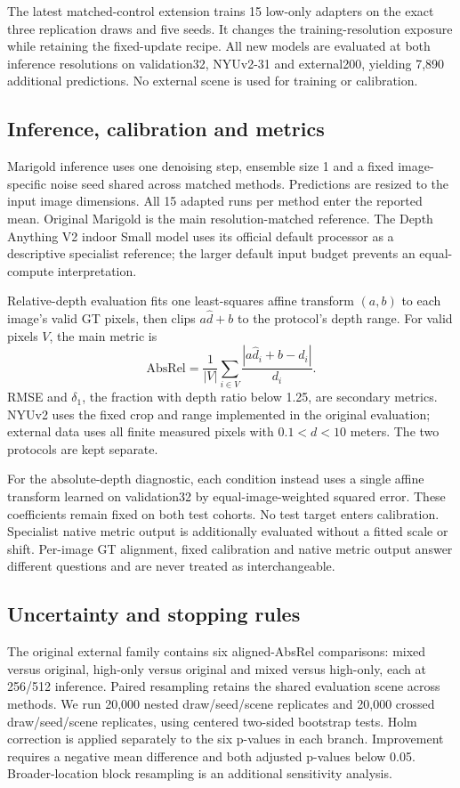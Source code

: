 \documentclass[10pt,twocolumn,letterpaper]{article}
\begin{document}
The latest matched-control extension trains 15 low-only adapters on the exact three replication draws and five seeds. It changes the training-resolution exposure while retaining the fixed-update recipe. All new models are evaluated at both inference resolutions on validation32, NYUv2-31 and external200, yielding 7,890 additional predictions. No external scene is used for training or calibration.

\subsection{Inference, calibration and metrics}
Marigold inference uses one denoising step, ensemble size 1 and a fixed image-specific noise seed shared across matched methods. Predictions are resized to the input image dimensions. All 15 adapted runs per method enter the reported mean. Original Marigold is the main resolution-matched reference. The Depth Anything V2 indoor Small model uses its official default processor as a descriptive specialist reference; the larger default input budget prevents an equal-compute interpretation.

Relative-depth evaluation fits one least-squares affine transform $(a,b)$ to each image's valid GT pixels, then clips $a\hat d+b$ to the protocol's depth range. For valid pixels $V$, the main metric is
\begin{equation}
\mathrm{AbsRel}=\frac{1}{|V|}\sum_{i\in V}\frac{|a\hat d_i+b-d_i|}{d_i}.
\end{equation}
RMSE and $\delta_1$, the fraction with depth ratio below 1.25, are secondary metrics. NYUv2 uses the fixed crop and range implemented in the original evaluation; external data uses all finite measured pixels with $0.1<d<10$ meters. The two protocols are kept separate.

For the absolute-depth diagnostic, each condition instead uses a single affine transform learned on validation32 by equal-image-weighted squared error. These coefficients remain fixed on both test cohorts. No test target enters calibration. Specialist native metric output is additionally evaluated without a fitted scale or shift. Per-image GT alignment, fixed calibration and native metric output answer different questions and are never treated as interchangeable.

\subsection{Uncertainty and stopping rules}
The original external family contains six aligned-AbsRel comparisons: mixed versus original, high-only versus original and mixed versus high-only, each at 256/512 inference. Paired resampling retains the shared evaluation scene across methods. We run 20,000 nested draw/seed/scene replicates and 20,000 crossed draw/seed/scene replicates, using centered two-sided bootstrap tests. Holm correction is applied separately to the six p-values in each branch. Improvement requires a negative mean difference and both adjusted p-values below 0.05. Broader-location block resampling is an additional sensitivity analysis.
\end{document}
